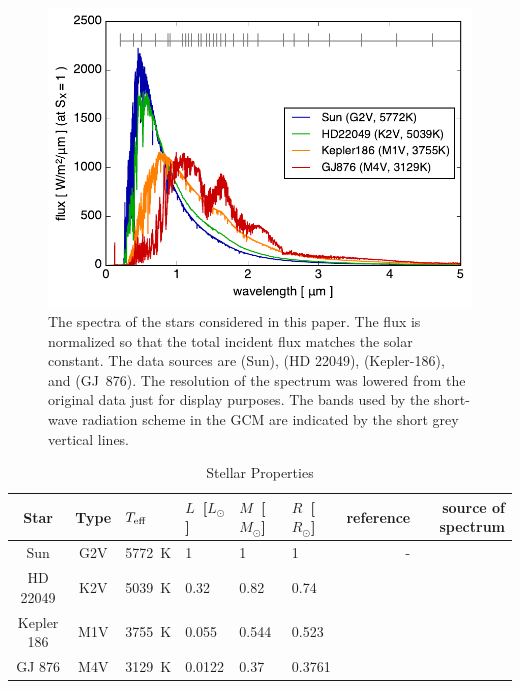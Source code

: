 \documentclass[11pt,numberedappendix,twocolappendix,]{emulateapj}
\newcommand{\dsa}[1]{{\color{blue}#1}}
\begin{document}
\begin{figure}[!bh]
    \begin{center}
    \includegraphics[width=\hsize]{fig/star_spectra.pdf}
    \end{center}
\caption{The spectra of the stars considered in this paper. The flux is normalized so that the total incident flux matches the solar constant. The data sources are \citet{Kurucz1995} (Sun), \citet{Segura2003} (HD 22049), \citet{Allard2012} (Kepler-186), and \citet{Domagal-Goldman2014} (GJ~876). The resolution of the spectrum was lowered from the original data just for display purposes. \dsa{The bands used by the short-wave radiation scheme in the GCM are indicated by the short grey vertical lines.}}
\label{fig:star_spectra}
\end{figure}



\begin{table}[btp]
\caption{Stellar Properties}
\begin{center}
\begin{tabular}{ccllllrr} \hline \hline
%
Star & Type & $T_{\rm eff}$ & $L$~[$L_{\odot}$] & $M$~[$M_{\odot}$] & $R$~[$R_{\odot}$] & reference & source of spectrum \\ \hline
%
Sun & G2V & 5772~K & 1 & 1 & 1 & - & \citet{Kurucz1995} \\ 
%
HD 22049 & K2V & 5039~K & 0.32 & 0.82 & 0.74 & \citet{Baines2012} & \citet{Segura2003} \\
%
Kepler 186 & M1V & 3755~K & 0.055 & 0.544 & 0.523 & \citet{Torres2015} & \citet{Allard2012} \\
%
GJ 876 & M4V & 3129~K & 0.0122 & 0.37 & 0.3761 & \citet{vonBraun2014} & \citet{Domagal-Goldman2014} \\ \hline
\end{tabular}
\end{center}
\label{tbl:stellar_properties}
\end{table}%
\end{document}
